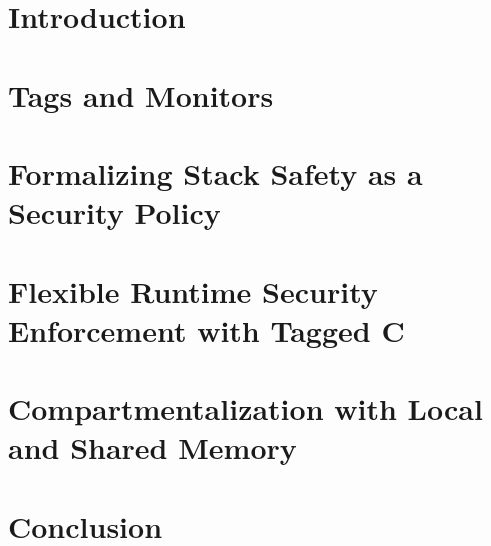 \documentclass[double,12pt]{psutex}
\theoremstyle{definition}
\begin{document}
\chapter{Introduction}
\label{ch:intro}


\chapter{Tags and Monitors}
\label{ch:background}

\chapter{Formalizing Stack Safety as a Security Policy}
\label{ch:stacksafety}


\chapter{Flexible Runtime Security Enforcement with Tagged C}
\label{ch:taggedc}


\chapter{Compartmentalization with Local and Shared Memory}
\label{ch:compartments}


\chapter{Conclusion}
\label{ch:conclusion}




\end{document}
